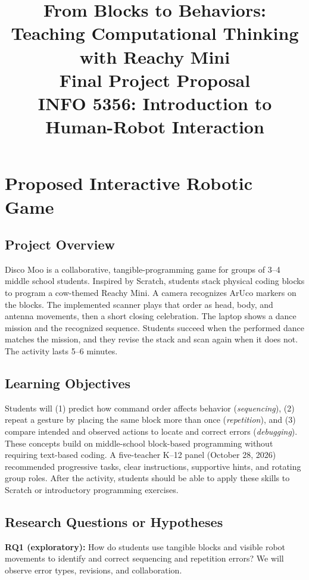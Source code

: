 \documentclass[conference,12pt,letterpaper]{IEEEtran}
\title{From Blocks to Behaviors: Teaching Computational Thinking with Reachy Mini\\
\large Final Project Proposal\\
INFO 5356: Introduction to Human-Robot Interaction}
\author{
\IEEEauthorblockN{Elliot Zhang, Jaclyn Pham, Yifan (Fanning) Luo, Jiaxin (Aurora) Shen}
\IEEEauthorblockA{Cornell Tech\\
\{qz432, cqp4, yl4389, js3996\}@cornell.edu}
}
\begin{document}
\maketitle

\section{Proposed Interactive Robotic Game}

\subsection{Project Overview}

Disco Moo is a collaborative, tangible-programming game for groups of 3--4 middle school students. Inspired by Scratch, students stack physical coding blocks to program a cow-themed Reachy Mini. A camera recognizes ArUco markers on the blocks. The implemented scanner plays that order as head, body, and antenna movements, then a short closing celebration. The laptop shows a dance mission and the recognized sequence. Students succeed when the performed dance matches the mission, and they revise the stack and scan again when it does not. The activity lasts 5--6 minutes.

\subsection{Learning Objectives}

Students will (1) predict how command order affects behavior (\emph{sequencing}), (2) repeat a gesture by placing the same block more than once (\emph{repetition}), and (3) compare intended and observed actions to locate and correct errors (\emph{debugging}). These concepts build on middle-school block-based programming without requiring text-based coding. A five-teacher K--12 panel (October 28, 2026) recommended progressive tasks, clear instructions, supportive hints, and rotating group roles. After the activity, students should be able to apply these skills to Scratch or introductory programming exercises.

\subsection{Research Questions or Hypotheses}

\textbf{RQ1 (exploratory):} How do students use tangible blocks and visible robot movements to identify and correct sequencing and repetition errors? We will observe error types, revisions, and collaboration.
\end{document}
